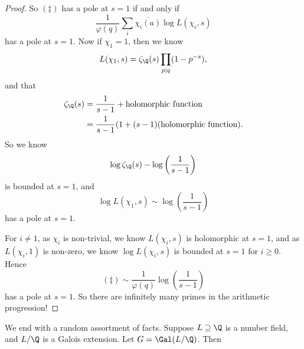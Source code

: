 \documentclass[a4paper]{article}
\begin{document}
\begin{proof}
  So $(\ddagger)$ has a pole at $s = 1$ if and only if
  \[
    \frac{1}{\varphi(q)} \sum_i \overline{\chi_i (a)} \log L(\chi_i, s)
  \]
  has a pole at $s = 1$. Now if $\chi_1 = 1$, then we know
  \[
    L(\chi_1, s) = \zeta_{\Q}(s) \prod_{p \mid q}(1 - p^{-s}),
  \]
  and that
  \begin{align*}
    \zeta_\Q(s) &= \frac{1}{s - 1} + \text{holomorphic function} \\
    &= \frac{1}{s - 1}(1 + (s - 1)(\text{holomorphic function}).
  \end{align*}
  So we know
  \[
    \log \zeta_\Q(s) - \log\left(\frac{1}{s - 1}\right)
  \]
  is bounded at $s = 1$, and
  \[
    \log L(\chi_1, s) \sim \log\left(\frac{1}{s - 1}\right)
  \]
  has a pole at $s = 1$.

  For $i \not= 1$, as $\chi_i$ is non-trivial, we know $L(\chi_i, s)$ is holomorphic at $s = 1$, and as $L(\chi_i, 1)$ is non-zero, we know $\log L(\chi_i, s)$ is bounded at $s = 1$ for $i \geq 0$. Hence
  \[
    (\ddagger) \sim \frac{1}{\varphi(q)} \log\left(\frac{1}{s - 1}\right)
  \]
  has a pole at $s = 1$. So there are infinitely many primes in the arithmetic progression!
\end{proof}

We end with a random assortment of facts. Suppose $L \supseteq \Q$ is a number field, and $L/\Q$ is a Galois extension. Let $G = \Gal(L/\Q)$. Then
\end{document}
